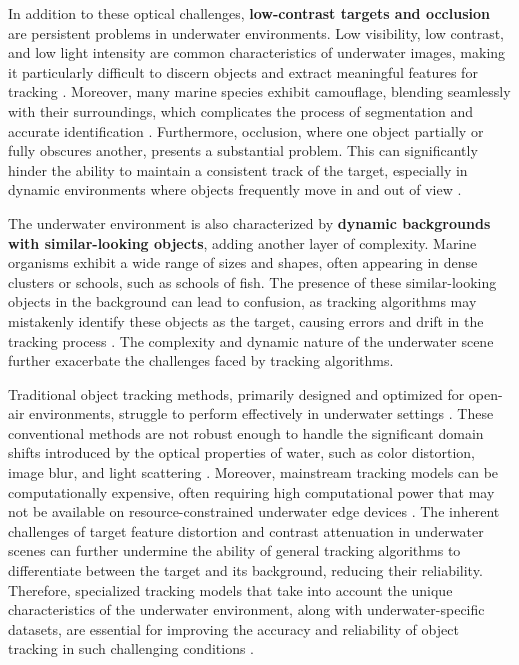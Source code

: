 In addition to these optical challenges, \textbf{low-contrast targets and occlusion} are persistent problems in underwater environments. Low visibility, low contrast, and low light intensity are common characteristics of underwater images, making it particularly difficult to discern objects and extract meaningful features for tracking \cite{zhou2024real}\cite{bhadouriaunderwater}. Moreover, many marine species exhibit camouflage, blending seamlessly with their surroundings, which complicates the process of segmentation and accurate identification \cite{elmezain2025advancing}. Furthermore, occlusion, where one object partially or fully obscures another, presents a substantial problem. This can significantly hinder the ability to maintain a consistent track of the target, especially in dynamic environments where objects frequently move in and out of view  \cite{zhou2024real}\cite{elmezain2025advancing}\cite{mathias2022occlusion}.

The underwater environment is also characterized by \textbf{dynamic backgrounds with similar-looking objects}, adding another layer of complexity. Marine organisms exhibit a wide range of sizes and shapes, often appearing in dense clusters or schools, such as schools of fish. The presence of these similar-looking objects in the background can lead to confusion, as tracking algorithms may mistakenly identify these objects as the target, causing errors and drift in the tracking process \cite{zhang2024webuot}. The complexity and dynamic nature of the underwater scene further exacerbate the challenges faced by tracking algorithms.

Traditional object tracking methods, primarily designed and optimized for open-air environments, struggle to perform effectively in underwater settings \cite{elmezain2025advancing}. These conventional methods are not robust enough to handle the significant domain shifts introduced by the optical properties of water, such as color distortion, image blur, and light scattering \cite{elmezain2025advancing}. Moreover, mainstream tracking models can be computationally expensive, often requiring high computational power that may not be available on resource-constrained underwater edge devices \cite{qiu2024boundary}. The inherent challenges of target feature distortion and contrast attenuation in underwater scenes can further undermine the ability of general tracking algorithms to differentiate between the target and its background, reducing their reliability. Therefore, specialized tracking models that take into account the unique characteristics of the underwater environment, along with underwater-specific datasets, are essential for improving the accuracy and reliability of object tracking in such challenging conditions \cite{elmezain2025advancing}.

\endinput